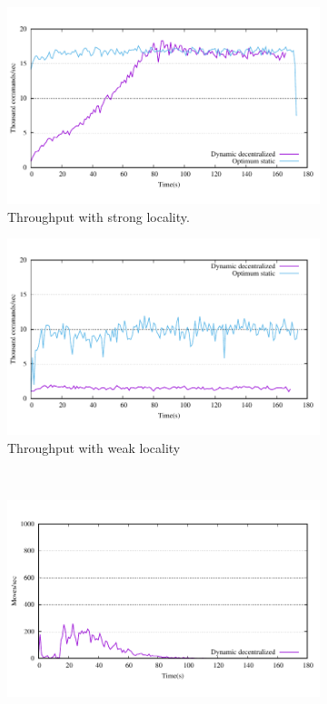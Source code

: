 \begin{figure}[t]
  \centering
  \begin{subfigure}[b]{0.45\textwidth}
    \centering
    \includegraphics[width=0.95\columnwidth]{figures/motivation-tp-strong-locality}    
    \caption{Throughput with strong locality.}
  \end{subfigure}
  \begin{subfigure}[b]{0.45\textwidth}
    \centering
    \includegraphics[width=0.95\columnwidth]{figures/motivation-tp-weak-locality}
    \caption{Throughput with weak locality}
  \end{subfigure} \\
  \begin{subfigure}[b]{0.45\textwidth}
    \centering
    \includegraphics[width=0.95\columnwidth]{figures/motivation-moves-strong-locality}

\end{subfigure}
\end{figure}
